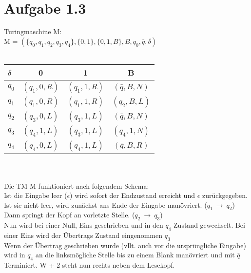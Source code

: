 \documentclass{article}
\begin{document}
	\section[a 1.3]{Aufgabe 1.3}
	Turingmaschine M:\\
	M = $(\{q_0,q_1,q_2,q_3,q_4\},\{0,1\},\{0,1,B\},B,q_0,\bar{q},\delta)$\\\\
	\begin{tabular}{l || c c c}
		$\delta$ & 0 & 1 & B\\
		\hline
		$q_0$ & $(q_1,0,R)$ & $(q_1,1,R)$ & $(\bar{q},B,N)$\\
		$q_1$ & $(q_1,0,R)$ & $(q_1,1,R)$ & $(q_2,B,L)$\\
		$q_2$ & $(q_3,0,L)$ & $(q_3,1,L)$ & $(\bar{q},B,N)$\\
		$q_3$ & $(q_4,1,L)$ & $(q_3,1,L)$ & $(q_4,1,N)$\\
		$q_4$ & $(q_4,0,L)$ & $(q_4,1,L)$ & $(\bar{q},B,R)$\\
	\end{tabular}\\\\
	Die TM M funktioniert nach folgendem Schema:\\
	Ist die Eingabe leer ($\epsilon$) wird sofort der Endzustand erreicht und $\epsilon$ zurückgegeben.\\
	Ist sie nicht leer, wird zunächst ans Ende der Eingabe manövriert. ($q_1\ \rightarrow\ q_2$)\\
	Dann springt der Kopf an vorletzte Stelle. ($q_2\ \rightarrow\ q_3$)\\
	Nun wird bei einer Null, Eins geschrieben und in den $q_4$ Zustand gewechselt. Bei einer Eins wird der Übertrags Zustand eingenommen $q_3$\\
	Wenn der Übertrag geschrieben wurde (vllt. auch vor die ursprüngliche Eingabe) wird in $q_4$ an die linksmögliche Stelle bis zu einem Blank manövriert und mit $\bar{q}$ Terminiert. W + 2 steht nun rechts neben dem Lesekopf.
\end{document}
